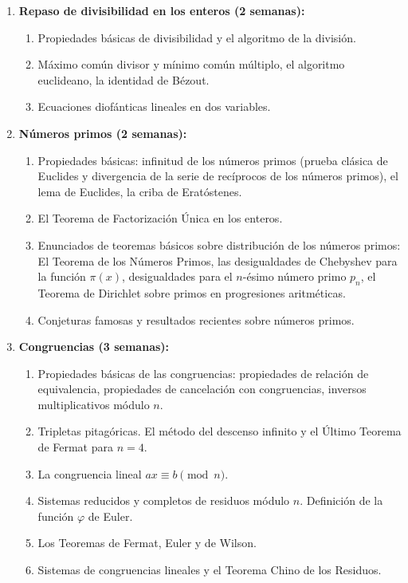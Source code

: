 \begin{refsection}
\begin{enumerate}
\item \textbf{Repaso de divisibilidad en los enteros (2 semanas):} 
\begin{enumerate}
    \item Propiedades básicas de divisibilidad y el algoritmo de la división.
    \item Máximo común divisor y mínimo común múltiplo, el algoritmo euclideano, la identidad de Bézout.
    \item Ecuaciones diofánticas lineales en dos variables.
\end{enumerate}

\item \textbf{Números primos (2 semanas):} 
\begin{enumerate}
    \item Propiedades básicas: infinitud de los números primos (prueba clásica de Euclides y divergencia de la serie de recíprocos de los números primos), el lema de Euclides, la criba de Eratóstenes.
    \item El Teorema de Factorización Única en los enteros.
    \item Enunciados de teoremas básicos sobre distribución de los números primos: El Teorema de los Números Primos, las desigualdades de Chebyshev para la función $\pi(x)$, desigualdades para el $n$-ésimo número primo $p_n$, el Teorema de Dirichlet sobre primos en progresiones aritméticas.
    \item Conjeturas famosas y resultados recientes sobre números primos.
\end{enumerate}

\item \textbf{Congruencias (3 semanas):} 
\begin{enumerate}
    \item Propiedades básicas de las congruencias: propiedades de relación de equivalencia, propiedades de cancelación con congruencias, inversos multiplicativos módulo $n$.
    \item Tripletas pitagóricas. El método del descenso infinito y el Último Teorema de Fermat para $n = 4$.
    \item La congruencia lineal $ax \equiv b \pmod{n}$.
    \item Sistemas reducidos y completos de residuos módulo $n$. Definición de la función $\varphi$ de Euler.
    \item Los Teoremas de Fermat, Euler y de Wilson.
    \item Sistemas de congruencias lineales y el Teorema Chino de los Residuos.
\end{enumerate}


\end{enumerate}
\end{refsection}
